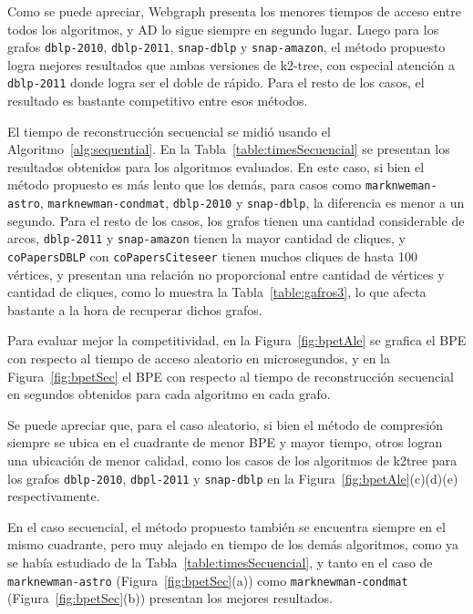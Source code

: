Como se puede apreciar, Webgraph presenta los menores tiempos de acceso entre todos los algoritmos, y AD lo sigue siempre en segundo lugar. Luego para los grafos \texttt{dblp-2010}, \texttt{dblp-2011}, \texttt{snap-dblp} y \texttt{snap-amazon}, el método propuesto logra mejores resultados que ambas versiones de k2-tree, con especial atención a \texttt{dblp-2011} donde logra ser el doble de rápido. Para el resto de los casos, el resultado es bastante competitivo entre esos métodos.



El tiempo de reconstrucción secuencial se midió usando el Algoritmo~\ref{alg:sequential}. En la Tabla~\ref{table:timesSecuencial} se presentan los resultados obtenidos para los algoritmos evaluados. En este caso, si bien el método propuesto es más lento que los demás, para casos como \texttt{marknweman-astro}, \texttt{marknewman-condmat}, \texttt{dblp-2010} y \texttt{snap-dblp}, la diferencia es menor a un segundo. Para el resto de los casos, los grafos tienen una cantidad considerable de arcos, \texttt{dblp-2011} y \texttt{snap-amazon} tienen la mayor cantidad de cliques, y \texttt{coPapersDBLP} con \texttt{coPapersCiteseer} tienen muchos cliques de hasta 100 vértices, y presentan una relación no proporcional entre cantidad de vértices y cantidad de cliques, como lo muestra la Tabla~\ref{table:gafros3}, lo que afecta bastante a la hora de recuperar dichos grafos.

Para evaluar mejor la competitividad, en la Figura~\ref{fig:bpetAle} se grafica el BPE con respecto al tiempo de acceso aleatorio en microsegundos, y en la Figura~\ref{fig:bpetSec} el BPE con respecto al tiempo de reconstrucción secuencial en segundos obtenidos para cada algoritmo en cada grafo. 

Se puede apreciar que, para el caso aleatorio, si bien el método de compresión siempre se ubica en el cuadrante de menor BPE y mayor tiempo, otros logran una ubicación de menor calidad, como los casos de los algoritmos de k2tree para los grafos \texttt{dblp-2010}, \texttt{dbpl-2011} y \texttt{snap-dblp} en la Figura~\ref{fig:bpetAle}(c)(d)(e) respectivamente. 

En el caso secuencial, el método propuesto también se encuentra siempre en el mismo cuadrante, pero muy alejado en tiempo de los demás algoritmos, como ya se había estudiado de la Tabla~\ref{table:timesSecuencial}, y tanto en el caso de \texttt{marknewman-astro} (Figura~\ref{fig:bpetSec}(a)) como \texttt{marknewman-condmat} (Figura~\ref{fig:bpetSec}(b)) presentan los mejores resultados.

